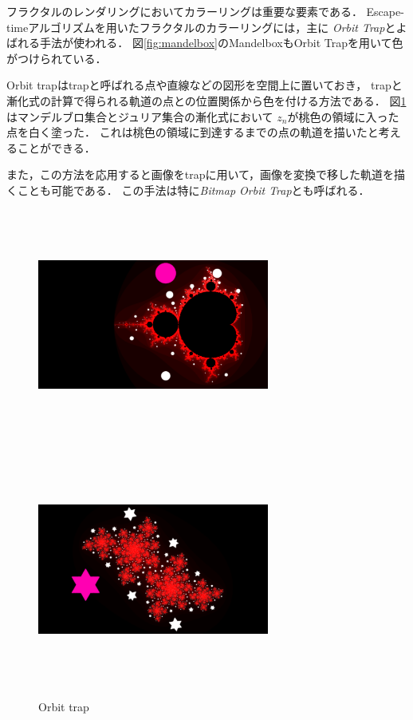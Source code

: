 フラクタルのレンダリングにおいてカラーリングは重要な要素である．
Escape-timeアルゴリズムを用いたフラクタルのカラーリングには，主に\textit{
Orbit Trap}とよばれる手法が使われる．
図\ref{fig:mandelbox}のMandelboxもOrbit Trapを用いて色がつけられている．

Orbit trapはtrapと呼ばれる点や直線などの図形を空間上に置いておき，
trapと漸化式の計算で得られる軌道の点との位置関係から色を付ける方法である．
図\ref{fig:orbitTrap}はマンデルブロ集合とジュリア集合の漸化式において
$z_n$が桃色の領域に入った点を白く塗った．
これは桃色の領域に到達するまでの点の軌道を描いたと考えることができる．

また，この方法を応用すると画像をtrapに用いて，画像を変換で移した軌道を描
くことも可能である．
この手法は特に\textit{Bitmap Orbit Trap}とも呼ばれる．

\begin{figure}[htbp]
 \begin{minipage}{0.49\hsize}
  \center
  \includegraphics[width=3in, height=3in, keepaspectratio]{../img/fractal/mandelbrot-orbit.pdf}
  \label{}
 \end{minipage}
 \begin{minipage}{0.49\hsize}
  \center
  \includegraphics[width=3in, height=3in,
   keepaspectratio]{../img/fractal/juliaOrbit.pdf}
  \label{}
 \end{minipage}
 \caption{Orbit trap}
 \label{fig:orbitTrap}
\end{figure}

